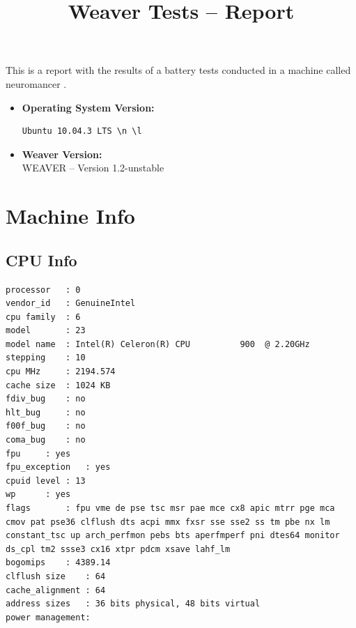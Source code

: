 \documentclass{article}
\title{Weaver Tests -- Report}
\begin{document}
\maketitle
This is a report with the results of a battery
tests conducted in a machine called 
neuromancer
.
\begin{itemize}
\item
\textbf{Operating System Version: }
\begin{verbatim}
Ubuntu 10.04.3 LTS \n \l

\end{verbatim}
\item
\textbf{Weaver Version: }\\
WEAVER -- Version 1.2-unstable
\end{itemize}
\section{Machine Info}
\subsection{CPU Info}
\begin{verbatim}
processor	: 0
vendor_id	: GenuineIntel
cpu family	: 6
model		: 23
model name	: Intel(R) Celeron(R) CPU          900  @ 2.20GHz
stepping	: 10
cpu MHz		: 2194.574
cache size	: 1024 KB
fdiv_bug	: no
hlt_bug		: no
f00f_bug	: no
coma_bug	: no
fpu		: yes
fpu_exception	: yes
cpuid level	: 13
wp		: yes
flags		: fpu vme de pse tsc msr pae mce cx8 apic mtrr pge mca cmov pat pse36 clflush dts acpi mmx fxsr sse sse2 ss tm pbe nx lm constant_tsc up arch_perfmon pebs bts aperfmperf pni dtes64 monitor ds_cpl tm2 ssse3 cx16 xtpr pdcm xsave lahf_lm
bogomips	: 4389.14
clflush size	: 64
cache_alignment	: 64
address sizes	: 36 bits physical, 48 bits virtual
power management:

\end{verbatim}
\end{document}
